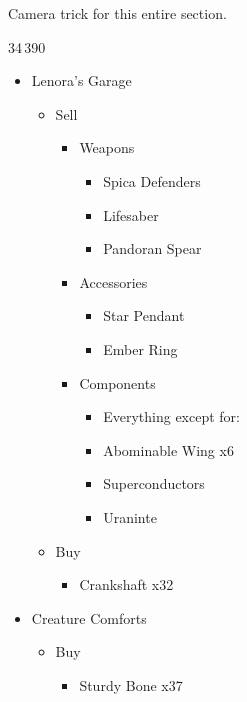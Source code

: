 	Camera trick for this entire section.
	\vfill
\columnbreak
	\begin{shop}{34\,390}
		\begin{itemize}
			\item Lenora's Garage
			      \begin{itemize}
				      \item Sell
				            \begin{itemize}
					            \item Weapons
					                  \begin{itemize}
						                  \item Spica Defenders
						                  \item Lifesaber
						                  \item Pandoran Spear
					                  \end{itemize}
					            \item Accessories
					                  \begin{itemize}
						                  \item Star Pendant
						                  \item Ember Ring
					                  \end{itemize}
					            \item Components
					                  \begin{itemize}
						                  \item Everything except for:
						                  \item Abominable Wing x6
						                  \item Superconductors
						                  \item Uraninte
					                  \end{itemize}
				            \end{itemize}
				      \item Buy
				            \begin{itemize}
					            \item Crankshaft x32
				            \end{itemize}
			      \end{itemize}
			\item Creature Comforts
			      \begin{itemize}
				      \item Buy
				            \begin{itemize}
					            \item Sturdy Bone x37

\end{itemize}
\end{itemize}
\end{itemize}
\end{shop}
